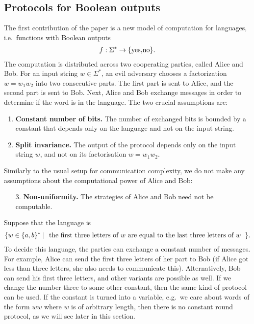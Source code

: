 \subsection{Protocols for Boolean outputs}
\label{sec:intro-boolean}
The first contribution of the paper is a new model of computation for languages, i.e.~functions with Boolean outputs
\begin{align*}
f : \Sigma^* \to \{\text{yes,no}\}.
\end{align*}
The computation is distributed across two cooperating parties, called Alice and Bob. For an input string $w \in \Sigma^*$, an evil adversary chooses a factorization $w = w_1 w_2$  into two consecutive parts. The first part is sent to Alice, and the second part is sent to Bob. Next, Alice and Bob exchange messages  in order to determine if the word is in the language. The two crucial assumptions are:
\begin{enumerate}
  \item \textbf{Constant number of bits.} The number of exchanged bits is bounded by a constant  that depends only on the language and not on the input string.
  \item \textbf{Split invariance.} The output of the protocol depends only on the input string $w$, and not on its factorisation $w=w_1 w_2$.
\end{enumerate}
Similarly to the usual setup for communication complexity,  we do not make any assumptions about the computational power of Alice and Bob:
\begin{enumerate}
    \item[3.] \textbf{Non-uniformity.} The strategies of Alice and Bob need not be computable.
\end{enumerate}


\begin{myexample}
Suppose that the language is 
\begin{align*}
\setbuild{ w \in \set{a,b}^*}{the first three letters of $w$ are equal to the last three letters of $w$}.
\end{align*}
To decide this language, the parties can exchange a constant number of messages. For example, Alice can send the first three letters of her part to Bob (if Alice got less than three letters, she also needs to communicate this). Alternatively, Bob can send his first three letters, and other variants are possible as well. If we change the number three to some other constant, then the same kind of protocol can be used. If the constant is turned into a variable, e.g.~we care about words of the form $ww$ where $w$ is of arbitrary length, then there is no constant round protocol, as we will see later in this section. 
\end{myexample}

